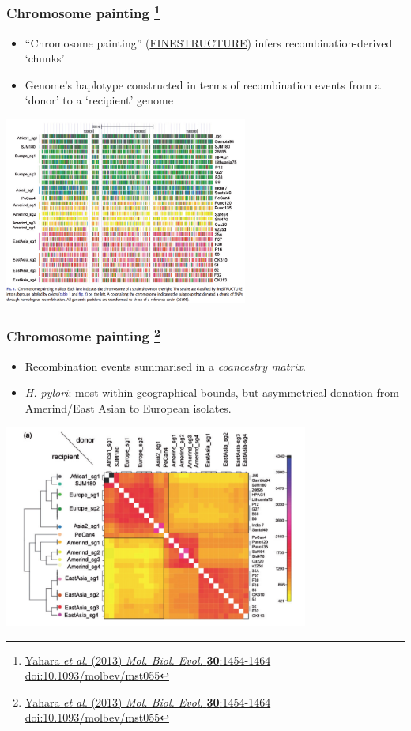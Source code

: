 \begin{frame}
  \frametitle{Chromosome painting
  \footnote{\tiny{\href{http://dx.doi.org/10.1093/molbev/mst055}{Yahara \textit{et al}. (2013) \textit{Mol. Biol. Evol.} \textbf{30}:1454-1464 doi:10.1093/molbev/mst055}}}
  }
  \begin{itemize}
    \item ``Chromosome painting'' (\textcolor{hutton_purple}{\href{http://www.paintmychromosomes.com/}{FINESTRUCTURE}}) infers recombination-derived `chunks'\\
    \item Genome's haplotype constructed in terms of recombination events from a `donor' to a `recipient' genome\\
  \end{itemize}
  \begin{center}
    \includegraphics[width=0.6\textwidth]{images/chromosome_painting}
  \end{center}     
\end{frame}

\begin{frame}
  \frametitle{Chromosome painting
  \footnote{\tiny{\href{http://dx.doi.org/10.1093/molbev/mst055}{Yahara \textit{et al}. (2013) \textit{Mol. Biol. Evol.} \textbf{30}:1454-1464 doi:10.1093/molbev/mst055}}}
  }
  \begin{itemize}
    \item Recombination events summarised in a \textit{coancestry matrix}.\\
    \item \textit{H. pylori}: most within geographical bounds, but asymmetrical donation from Amerind/East Asian to European isolates.
  \end{itemize}
  \begin{center}
    \includegraphics[width=0.75\textwidth]{images/coancestry}
  \end{center}     
\end{frame}
